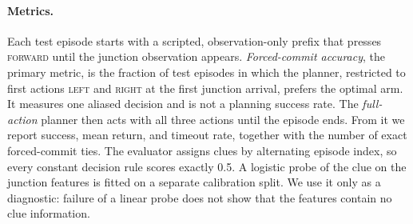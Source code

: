 \paragraph{Metrics.}
Each test episode starts with a scripted, observation-only prefix that presses \textsc{forward} until the junction observation appears. \emph{Forced-commit accuracy}, the primary metric, is the fraction of test episodes in which the planner, restricted to first actions \textsc{left} and \textsc{right} at the first junction arrival, prefers the optimal arm. It measures one aliased decision and is not a planning success rate. The \emph{full-action} planner then acts with all three actions until the episode ends. From it we report success, mean return, and timeout rate, together with the number of exact forced-commit ties. The evaluator assigns clues by alternating episode index, so every constant decision rule scores exactly 0.5. A logistic probe of the clue on the junction features is fitted on a separate calibration split. We use it only as a diagnostic: failure of a linear probe does not show that the features contain no clue information.

